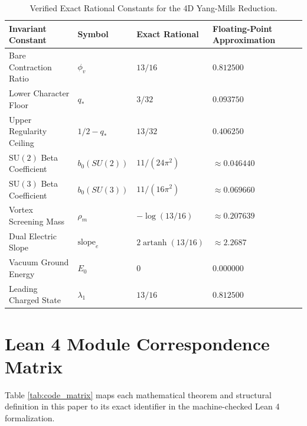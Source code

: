 \documentclass[11pt,reqno]{amsart}
\theoremstyle{plain}
\theoremstyle{definition}
\theoremstyle{remark}
\numberwithin{equation}{section}
\begin{document}
\begin{table}[htbp]
\centering
\caption{Verified Exact Rational Constants for the 4D Yang-Mills Reduction.}
\label{tab:exact_constants}
\begin{tabular}{llll}
\toprule
\textbf{Invariant Constant} & \textbf{Symbol} & \textbf{Exact Rational} & \textbf{Floating-Point Approximation} \\
\midrule
Bare Contraction Ratio & $\phi_v$ & $13/16$ & $0.812500$ \\
Lower Character Floor & $q_*$ & $3/32$ & $0.093750$ \\
Upper Regularity Ceiling & $1/2 - q_*$ & $13/32$ & $0.406250$ \\
$\mathrm{SU}(2)$ Beta Coefficient & $b_0(SU(2))$ & $11 / (24 \pi^2)$ & $\approx 0.046440$ \\
$\mathrm{SU}(3)$ Beta Coefficient & $b_0(SU(3))$ & $11 / (16 \pi^2)$ & $\approx 0.069660$ \\
Vortex Screening Mass & $\rho_m$ & $-\log(13/16)$ & $\approx 0.207639$ \\
Dual Electric Slope & $\mathrm{slope}_e$ & $2 \operatorname{artanh}(13/16)$ & $\approx 2.2687$ \\
Vacuum Ground Energy & $E_0$ & $0$ & $0.000000$ \\
Leading Charged State & $\lambda_1$ & $13/16$ & $0.812500$ \\
\bottomrule
\end{tabular}
\end{table}

\section{Lean 4 Module Correspondence Matrix}

Table \ref{tab:code_matrix} maps each mathematical theorem and structural definition in this paper to its exact identifier in the machine-checked Lean 4 formalization.
\end{document}
